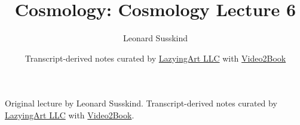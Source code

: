 \documentclass[11pt,oneside]{book}
\begin{document}
\frontmatter
\title{Cosmology: Cosmology Lecture 6}
\author{Leonard Susskind}
\date{Transcript-derived notes curated by \href{https://lazying.art}{LazyingArt LLC} with \href{https://github.com/lachlanchen/Video2Book}{Video2Book}}
\maketitle
\begin{center}
\small Original lecture by Leonard Susskind. Transcript-derived notes curated by \href{https://lazying.art}{LazyingArt LLC} with \href{https://github.com/lachlanchen/Video2Book}{Video2Book}.
\end{center}
\clearpage
\mainmatter

\end{document}
